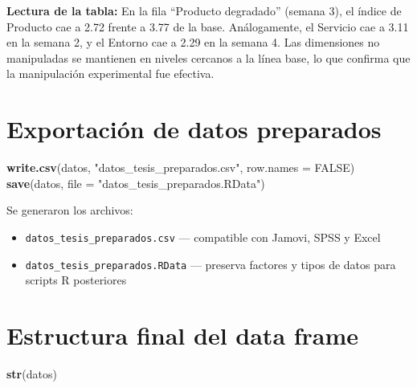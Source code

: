 \documentclass[
  spanish,
]{article}
\newenvironment{Shaded}{\begin{snugshade}}{\end{snugshade}}
\newcommand{\AttributeTok}[1]{\textcolor[rgb]{0.13,0.29,0.53}{#1}}
\newcommand{\ConstantTok}[1]{\textcolor[rgb]{0.56,0.35,0.01}{#1}}
\newcommand{\FunctionTok}[1]{\textcolor[rgb]{0.13,0.29,0.53}{\textbf{#1}}}
\newcommand{\NormalTok}[1]{#1}
\newcommand{\StringTok}[1]{\textcolor[rgb]{0.31,0.60,0.02}{#1}}
\providecommand{\tightlist}{%
  \setlength{\itemsep}{0pt}\setlength{\parskip}{0pt}}
\begin{document}
\textbf{Lectura de la tabla:} En la fila ``Producto degradado'' (semana
3), el índice de Producto cae a 2.72 frente a 3.77 de la base.
Análogamente, el Servicio cae a 3.11 en la semana 2, y el Entorno cae a
2.29 en la semana 4. Las dimensiones no manipuladas se mantienen en
niveles cercanos a la línea base, lo que confirma que la manipulación
experimental fue efectiva.

\section{Exportación de datos
preparados}\label{exportaciuxf3n-de-datos-preparados}

\begin{Shaded}
\begin{Highlighting}[]
\FunctionTok{write.csv}\NormalTok{(datos, }\StringTok{"datos\_tesis\_preparados.csv"}\NormalTok{, }\AttributeTok{row.names =} \ConstantTok{FALSE}\NormalTok{)}
\FunctionTok{save}\NormalTok{(datos, }\AttributeTok{file =} \StringTok{"datos\_tesis\_preparados.RData"}\NormalTok{)}
\end{Highlighting}
\end{Shaded}

Se generaron los archivos:

\begin{itemize}
\tightlist
\item
  \texttt{datos\_tesis\_preparados.csv} --- compatible con Jamovi, SPSS
  y Excel
\item
  \texttt{datos\_tesis\_preparados.RData} --- preserva factores y tipos
  de datos para scripts R posteriores
\end{itemize}

\section{Estructura final del data
frame}\label{estructura-final-del-data-frame}

\begin{Shaded}
\begin{Highlighting}[]
\FunctionTok{str}\NormalTok{(datos)}
\end{Highlighting}
\end{Shaded}
\end{document}
